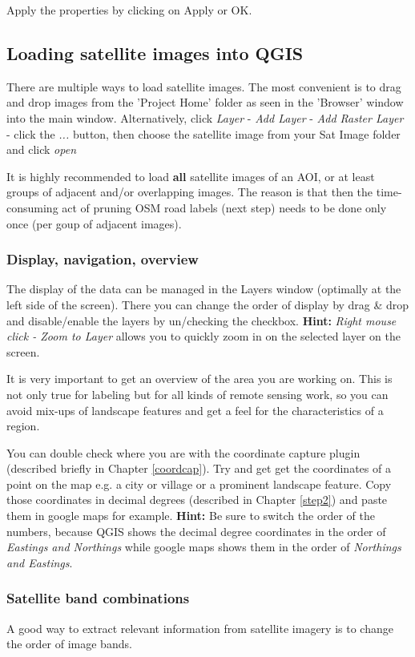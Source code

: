 \documentclass[12pt,a4paper]{scrartcl}
\begin{document}
Apply the properties by clicking on Apply or OK.


\subsection{Loading satellite images into QGIS}
\label{step3}
There are multiple ways to load satellite images. The most convenient is to drag and drop images from the 'Project Home' folder as seen in the 'Browser' window into the main window. Alternatively, click \textit{Layer} - \textit{Add Layer} - \textit{Add Raster Layer} - click the \textit{...} button, then choose the satellite image from your Sat Image folder and click \textit{open}

It is highly recommended to load \textbf{all} satellite images of an AOI, or at least groups of adjacent and/or overlapping images. The reason is that then the time-consuming act of pruning OSM road labels (next step) needs to be done only once (per goup of adjacent images).


\subsubsection{Display, navigation, overview}
The display of the data can be managed in the Layers window (optimally at the left side of the screen). There you can change the order of display by drag \& drop and disable/enable the layers by un/checking the checkbox. \textbf{Hint:} \textit{Right mouse click - Zoom to Layer} allows you to quickly zoom in on the selected layer on the screen.

It is very important to get an overview of the area you are working on. This is not only true for labeling but for all kinds of remote sensing work, so you can avoid mix-ups of landscape features and get a feel for the characteristics of a region.  

You can double check where you are with the coordinate capture plugin (described briefly in Chapter \ref{coordcap}).
Try and get get the coordinates of a point on the map e.g. a city or village or a prominent landscape feature. 
Copy those coordinates in decimal degrees (described in Chapter \ref{step2}) and paste them in google maps for example. \textbf{Hint:} Be sure to switch the order of the numbers, because QGIS shows the decimal degree coordinates in the order of \textit{Eastings and Northings} while google maps shows them in the order of \textit{Northings and Eastings}.

\subsubsection{Satellite band combinations}
A good way to extract relevant information from satellite imagery is to change the order of image bands.
\end{document}
